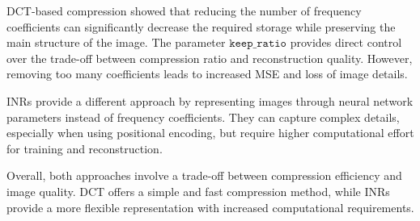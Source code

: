 DCT-based compression showed that reducing the number of frequency coefficients can significantly decrease the required storage while preserving the main structure of the image. The parameter $\texttt{keep\_ratio}$ provides direct control over the trade-off between compression ratio and reconstruction quality. However, removing too many coefficients leads to increased MSE and loss of image details.

INRs provide a different approach by representing images through neural network parameters instead of frequency coefficients. They can capture complex details, especially when using positional encoding, but require higher computational effort for training and reconstruction.

Overall, both approaches involve a trade-off between compression efficiency and image quality. DCT offers a simple and fast compression method, while INRs provide a more flexible representation with increased computational requirements.
